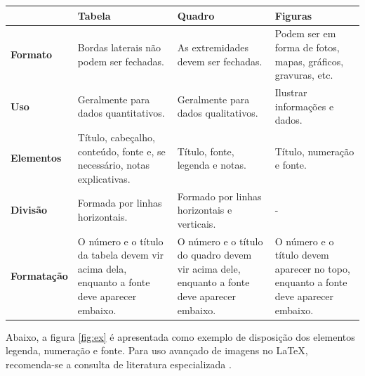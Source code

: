 \documentclass{jornada} %
\begin{document}
		
\begin{quadro}[H]
	\centering
	\caption{Alguns detalhes sobre elementos flutuantes}
	\label{quadroex1}
	\begin{tabular}{|l|m{4cm}|m{4cm}|m{4cm}|}
		\hline
		& \textbf{Tabela}                                                                             & \textbf{Quadro}                                                                             & \textbf{Figuras}                                                                    \\ \hline
		\textbf{Formato}    & Bordas laterais não podem ser fechadas.                                                     & As extremidades devem ser fechadas.                                                         & Podem ser em forma de fotos, mapas, gráficos, gravuras, etc.                        \\ \hline
		\textbf{Uso}        & Geralmente para dados quantitativos.                                                        & Geralmente para dados qualitativos.                                                         & Ilustrar informações e dados.                                                       \\ \hline
		\textbf{Elementos}  & Título, cabeçalho, conteúdo, fonte e, se necessário, notas explicativas.                    & Título, fonte, legenda e notas.                                                             & Título, numeração e fonte.                                                          \\ \hline
		\textbf{Divisão}    & Formada por linhas horizontais.                                                               & Formado por linhas horizontais e verticais.                                                 & -                                                                                   \\ \hline
		\textbf{Formatação} & O número e o título da tabela devem vir acima dela, enquanto a fonte deve aparecer embaixo. & O número e o título do quadro devem vir acima dele, enquanto a fonte deve aparecer embaixo. & O número e o título devem aparecer no topo, enquanto a fonte deve aparecer embaixo. \\ \hline
	\end{tabular}
\end{quadro}
				
Abaixo, a figura \ref{fig:ex} é apresentada como exemplo de disposição dos elementos legenda, numeração e fonte.
Para uso avançado de imagens no \LaTeX, recomenda-se a consulta de literatura especializada \cite{Goossens2007}.
\end{document}
